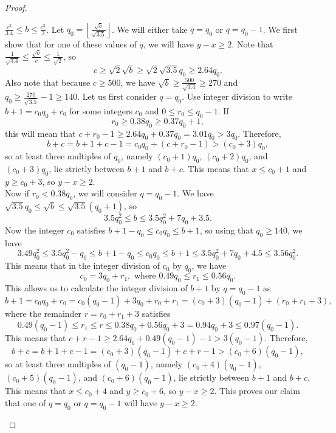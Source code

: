 \documentclass[10pt,a4paper]{amsart}
\begin{document}
\begin{proof}
\begin{case}$\frac{c^2}{3.4}\leq b\leq\frac{c^2}2$. Let $q_0=\left\lfloor\frac{\sqrt b}{\sqrt{3.5}}\right\rfloor$. We will either take $q=q_0$ or $q=q_0-1$. We first show that for one of these values of $q$, we will have $y-x\geq 2$. Note that $\frac 1{\sqrt{3.4}}\leq\frac{\sqrt b}c\leq\frac 1{\sqrt 2}$, so
\begin{equation*}
c\geq\sqrt 2\sqrt b\geq\sqrt 2\sqrt{3.5}q_0\geq 2.64q_0.
\end{equation*} Also note that because $c\geq 500$, we have $\sqrt b\geq\frac{500}{\sqrt{3.4}}\geq 270$ and $q_0\geq\frac{270}{\sqrt{3.5}}-1\geq 140$. Let us first consider $q=q_0$. Use integer division to write $b+1=c_0q_0+r_0$ for some integers $c_0$ and $0\leq r_0\leq q_0-1$. If 
\begin{equation*}r_0\geq 0.38q_0\geq 0.37q_0+1,\end{equation*}
this will mean that $c+r_0-1\geq 2.64q_0+0.37q_0=3.01q_0>3q_0$. Therefore,
\begin{equation*}
b+c=b+1+c-1=c_0q_0+(c+r_0-1)>(c_0+3)q_0,
\end{equation*}
so at least three multiples of $q_0$, namely $(c_0+1)q_0$, $(c_0+2)q_0$, and $(c_0+3)q_0$, lie strictly between $b+1$ and $b+c$. This means that $x\leq c_0+1$ and $y\geq c_0+3$, so $y-x\geq 2$.\\

Now if $r_0<0.38q_0$, we will consider $q=q_0-1$. We have $\sqrt{3.5}q_0\leq\sqrt b\leq\sqrt{3.5}(q_0+1)$, so
\begin{equation*}
3.5q_0^2\leq b\leq 3.5q_0^2+7q_0+3.5.
\end{equation*}
Now the integer $c_0$ satisfies $b+1-q_0\leq c_0q_0\leq b+1$, so using that $q_0\geq 140$, we have
\begin{equation*}
3.49q_0^2\leq 3.5q_0^2-q_0\leq b+1-q_0\leq c_0q_0\leq b+1\leq 3.5q_0^2+7q_0+4.5\leq 3.56q_0^2.
\end{equation*}
This means that in the integer division of $c_0$ by $q_0$, we have
\begin{equation*}
c_0=3q_0+r_1,\text{ where }0.49q_0\leq r_1\leq 0.56q_0.
\end{equation*}
This allows us to calculate the integer division of $b+1$ by $q=q_0-1$ as
\begin{equation*}
b+1=c_0q_0+r_0=c_0(q_0-1)+3q_0+r_0+r_1=(c_0+3)(q_0-1)+(r_0+r_1+3),
\end{equation*}
where the remainder $r=r_0+r_1+3$ satisfies
\begin{equation*}
0.49(q_0-1)\leq r_1\leq r\leq 0.38q_0+0.56q_0+3=0.94q_0+3\leq 0.97(q_0-1).
\end{equation*}
This means that $c+r-1\geq 2.64q_0+0.49(q_0-1)-1>3(q_0-1)$. Therefore,
\begin{equation*}
b+c=b+1+c-1=(c_0+3)(q_0-1)+c+r-1>(c_0+6)(q_0-1),
\end{equation*}
so at least three multiples of $(q_0-1)$, namely $(c_0+4)(q_0-1)$, $(c_0+5)(q_0-1)$, and $(c_0+6)(q_0-1)$, lie strictly between $b+1$ and $b+c$. This means that $x\leq c_0+4$ and $y\geq c_0+6$, so $y-x\geq 2$. This proves our claim that one of $q=q_0$ or $q=q_0-1$ will have $y-x\geq 2$.\\


\end{case}
\end{proof}
\end{document}
